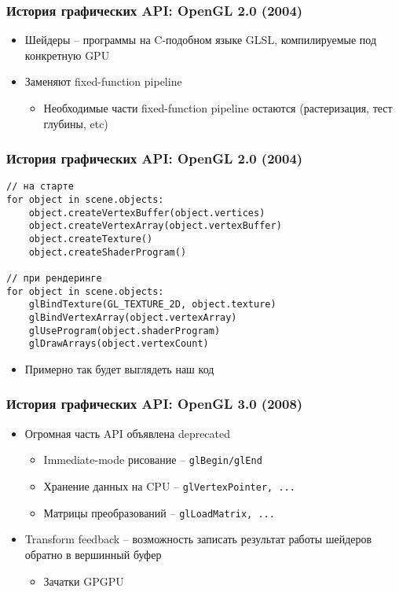 \documentclass{beamer}
\begin{document}
\begin{frame}
\frametitle{История графических API: OpenGL 2.0 (2004)}
\begin{itemize}
\item Шейдеры -- программы на C-подобном языке GLSL, компилируемые под конкретную GPU
\item Заменяют fixed-function pipeline
\begin{itemize}
\item Необходимые части fixed-function pipeline остаются (растеризация, тест глубины, etc)
\end{itemize}
\end{itemize}
\end{frame}

\begin{frame}[fragile]
\frametitle{История графических API: OpenGL 2.0 (2004)}
\begin{verbatim}
// на старте
for object in scene.objects:
    object.createVertexBuffer(object.vertices)
    object.createVertexArray(object.vertexBuffer)
    object.createTexture()
    object.createShaderProgram()

// при рендеринге
for object in scene.objects:
    glBindTexture(GL_TEXTURE_2D, object.texture)
    glBindVertexArray(object.vertexArray)
    glUseProgram(object.shaderProgram)
    glDrawArrays(object.vertexCount)
\end{verbatim}
\pause
\begin{itemize}
\item Примерно так будет выглядеть наш код
\end{itemize}
\end{frame}

\begin{frame}[fragile]
\frametitle{История графических API: OpenGL 3.0 (2008)}
\begin{itemize}
\item Огромная часть API объявлена deprecated
\pause
\begin{itemize}
\item Immediate-mode рисование -- \verb|glBegin/glEnd|
\item Хранение данных на CPU -- \verb|glVertexPointer, ...|
\item Матрицы преобразований -- \verb|glLoadMatrix, ...|
\end{itemize}
\pause
\item Transform feedback -- возможность записать результат работы шейдеров обратно в вершинный буфер
\begin{itemize}
\item Зачатки GPGPU
\end{itemize}
\end{itemize}
\end{frame}
\end{document}
